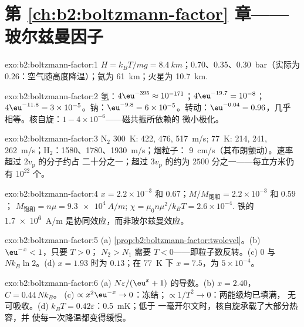 \section*{第 \ref{ch:b2:boltzmann-factor} 章——玻尔兹曼因子}

\begin{solution}{exo:b2:boltzmann-factor:1}
$H = k_BT/mg = \qty{8.4}{km}$；\qty{0.70}{}、\qty{0.35}{}、\qty{0.30}{bar}（实际为
\qty{0.26}{}：空气随高度降温）；氦为 \qty{61}{km}；火星为
\qty{10.7}{km}.
\end{solution}

\begin{solution}{exo:b2:boltzmann-factor:2}
氢：$4\eu^{-395} \approx 10^{-171}$；$4\eu^{-19.7} = 10^{-8}$；$4\eu^{-11.8} = 3 \times
10^{-5}$。钠：$\eu^{-9.8} = 6 \times 10^{-5}$。转动：$\eu^{-0.04} = 0.96$，几乎
相等。核自旋：$1 - 4 \times 10^{-6}$——磁共振所依赖的
微小极化。
\end{solution}

\begin{solution}{exo:b2:boltzmann-factor:3}
N$_2$ \qty{300}{K}: \qty{422}{}, \qty{476}{}, \qty{517}{m/s}; \qty{77}{K}: \qty{214}{}, \qty{241}{},
\qty{262}{m/s}；H$_2$：\qty{1580}{}、\qty{1780}{}、\qty{1930}{m/s}；烟粒子：
\qty{9}{cm/s}（其布朗颤动）。速率超过 $2v_{\text{p}}$ 的分子约占
二十分之一；超过 $3v_{\text{p}}$ 的约为 $2500$ 分之一——每立方米仍有 $10^{22}$ 个。
\end{solution}

\begin{solution}{exo:b2:boltzmann-factor:4}
$x = 2.2 \times 10^{-3}$ 和 $0.67$；$M/M_{\text{饱和}} = 2.2 \times 10^{-3}$ 和 $0.59$；
$M_{\text{饱和}} = n\mu = \qty{9.3e4}{A/m}$; $\chi = \mu_0n\mu^2/k_BT = 2.6 \times 10^{-4}$.
铁的 \qty{1.7e6}{A/m} 是协同效应，而非玻尔兹曼效应。
\end{solution}

\begin{solution}{exo:b2:boltzmann-factor:5}
(a) \cref{prop:b2:boltzmann-factor:twolevel}。(b) $\eu^{-x} < 1$，只要 $T > 0$；
$N_2 > N_1$ 需要 $T < 0$——即粒子数反转。(c) $0$ 与
$Nk_B\ln 2$。(d) $x = 1.93$ 时为 $0.13$；在 \qty{77}{K} 下 $x = 7.5$，为 $5 \times 10^{-4}$。
\end{solution}

\begin{solution}{exo:b2:boltzmann-factor:6}
(a) $N\varepsilon/(\eu^x + 1)$ 的导数。(b) $x = 2.40$，$C = 0.44\,Nk_B$。
(c) $\propto x^2\eu^{-x} \to 0$：冻结；$\propto 1/T^2 \to 0$：两能级均已填满，
无可吸收。(d) $k_BT = 0.42\varepsilon$：\qty{0.5}{mK}；低于
一毫开尔文时，核自旋承载了大部分热容，并
使每一次降温都变得缓慢。
\end{solution}

